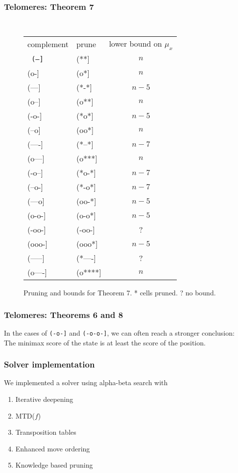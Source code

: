 \documentclass{beamer}
\begin{document}
    \begin{frame}
        \frametitle{Telomeres: Theorem 7}
            \begin{figure}
            {\small\tt
            \begin{tabular}{llc}
            complement & prune & lower bound on $\mu_x$ \\
            \tt
            (--] & (**] & {$n$} \\
            (o-] & (o*] & {$n$} \\
            (---]& (*-*] &  {$n-5$} \\
            (o--]& (o**] &  {$n$} \\
            (-o-]& (*o*] &  {$n-5$} \\
            (--o]& (oo*] &  {$n$}\\
            (----]& (*--*]&  {$n-7$} \\
            (o---]& (o***]&  {$n$} \\
            (-o--]& (*o-*]&  {$n-7$} \\
            (--o-]& (*-o*]&  {$n-7$}\\
            (---o]& (oo-*]&  {$n-5$}\\
            (o-o-]& (o-o*]&  {$n-5$}\\
            (-oo-]& (-oo-]&  ?\\
            (ooo-]& (ooo*]&  {$n-5$}\\
            (-----]& (*----]& ? \\
            (o----]& (o****]& {$n$} \\
            \end{tabular}
            }
        \caption{Pruning and bounds for Theorem 7. * cells pruned. ? no bound.}
            \label{fig:tel3}
            \end{figure}
    \end{frame}

    \begin{frame}
        \frametitle{Telomeres: Theorems 6 and 8}
        In the cases of \texttt{(-o-]} and \texttt{(-o-o-]}, we can often reach a stronger conclusion: \\\medskip
        The minimax score of the state is at least the score of the position.
    \end{frame}

    \begin{frame}
        \frametitle{Solver implementation}
        We implemented a solver using alpha-beta search with
        \begin{enumerate}
            \item Iterative deepening
            \item MTD($f$)
            \item Transposition tables
            \item Enhanced move ordering
            \item Knowledge based pruning
        \end{enumerate}
    \end{frame}
\end{document}
